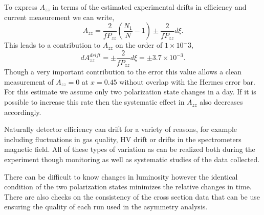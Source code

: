 To express $A_{zz}$ in terms of the estimated experimental drifts in efficiency and current measurement we can write,
\begin{equation}
A_{zz}=\frac{2}{fP_{zz}}\left(\frac{N_1}{N}-1\right)\pm\frac{2}{fP_{zz}}d\xi.
\end{equation}
This leads to a contribution to $A_{zz}$ on the order of $1\times10^-3$,
\begin{equation}
dA_{zz}^{drift}=\pm\frac{2}{fP_{zz}}d\xi=\pm3.7\times10^{-3}.
\end{equation}
Though a very important contribution to the error this value allows a clean measurement of $A_{zz}=0$ at $x=0.45$
without overlap with the Hermes error bar.  For this estimate we assume only two polarization state changes in a
day.  If it is possible to increase this rate then the systematic effect in $A_{zz}$ also decreases accordingly.

Naturally detector efficiency can drift for a variety of reasons, for
example including fluctuations in gas quality, HV drift or
drifts in the spectrometers magnetic field.  All of these types of variation as can be realized both
during the experiment though monitoring as well as systematic studies of the data collected.

There can be difficult to know changes in luminosity however the identical condition of the two
polarization states minimizes the relative changes in time.  There are also checks on the consistency
of the cross section data that can be use ensuring the quality of each run used in the asymmetry analysis.






















